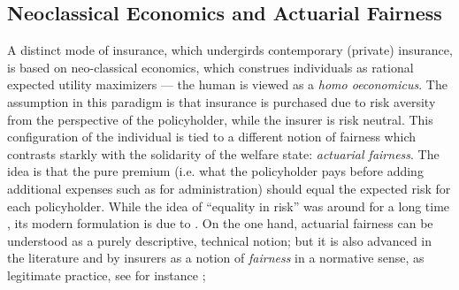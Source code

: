 \documentclass[11pt]{article} %
\makeatletter
\newcommand*{\ie}{i.e.\@\xspace}
\makeatother
\begin{document}
\subsection{Neoclassical Economics and Actuarial Fairness}
\label{sec:neoclassical}
A distinct mode of insurance, which undergirds contemporary (private) insurance, is based on neo-classical economics, which construes individuals as rational expected utility maximizers --- the human is viewed as a \textit{homo oeconomicus}. The assumption in this paradigm is that insurance is purchased due to risk aversity from the perspective of the policyholder, while the insurer is risk neutral. 
This configuration of the individual is tied to a different notion of fairness which contrasts starkly with the solidarity of the welfare state: \textit{actuarial fairness}. The idea is that the pure premium (\ie what the policyholder pays before adding additional expenses such as for administration) should equal the expected risk for each policyholder. While the idea of ``equality in risk'' was around for a long time \citep{martinez2016fair}, its modern formulation is due to \citet{arrow1963uncertainty}.
On the one hand, actuarial fairness can be understood as a purely descriptive, technical notion; but it is also advanced in the literature and by insurers as a notion of \textit{fairness} in a normative sense, as legitimate practice, see for instance
\citep{walters1981risk,clifford1987aids,daniels1990insurability,stone2001admissions,thiery2006fairness}; 
\end{document}
